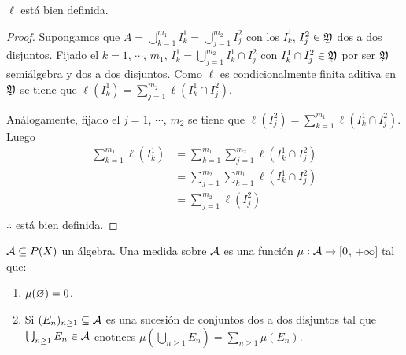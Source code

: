 \begin{prop}
    \(\ell\) está bien definida.

    \begin{proof}
        Supongamos que \(A = \bigcup_{k = 1}^{m_1} I_k^1 = \bigcup_{j = 1}^{m_2} I_j^2\) con los \(I_k^1\), \(I_j^2 \in \mathfrak{Y}\) dos a dos disjuntos.
        Fijado el \(k = 1\), \(\cdots\), \(m_1\), \(I_k^1 = \bigcup_{j = 1}^{m_2} I_k^1 \cap I_j^2\) con \(I_k^1 \cap I_j^2 \in \mathfrak{Y}\) por ser \(\mathfrak{Y}\) semiálgebra y dos a dos disjuntos.
        Como \(\ell\) es condicionalmente finita aditiva en \(\mathfrak{Y}\) se tiene que \(\ell(I_k^1) = \sum_{j = 1}^{m_2} \ell(I_k^1 \cap I_j^2)\).

        Análogamente, fijado el \(j = 1\), \(\cdots\), \(m_2\) se tiene que \(\ell(I_j^2) = \sum_{k = 1}^{m_1} \ell(I_k^1 \cap I_j^2)\).
        Luego \begin{align*}
            \sum_{k = 1}^{m_1} \ell(I_k^1) & = \sum_{k = 1}^{m_1} \sum_{j = 1}^{m_2} \ell(I_k^1 \cap I_j^2) \\
                                           & = \sum_{j = 1}^{m_2} \sum_{k = 1}^{m_1}\ell(I_k^1 \cap I_j^2)  \\
                                           & = \sum_{j = 1}^{m_2} \ell(I_j^2)                               \\
        \end{align*}
        \(\therefore\) está bien definida.
    \end{proof}
\end{prop}

\begin{definition}
    \(\mathcal{A} \subseteq P(X)\) un álgebra. Una medida sobre \(\mathcal{A}\) es una función \(\mu : \mathcal{A} \to [0\), \(+\infty]\) tal que: \begin{enumerate}
        \item \(\mu(\varnothing) = 0\).
        \item Si \((E_n)_{n \geq 1} \subseteq \mathcal{A}\) es una sucesión de conjuntos dos a dos disjuntos tal que \(\bigcup_{n \geq 1} E_n \in \mathcal{A}\) enotnces
              \(\mu(\bigcup_{n \geq 1} E_n) = \sum_{n \geq 1} \mu(E_n)\).
    \end{enumerate}
\end{definition}

\clearpage

